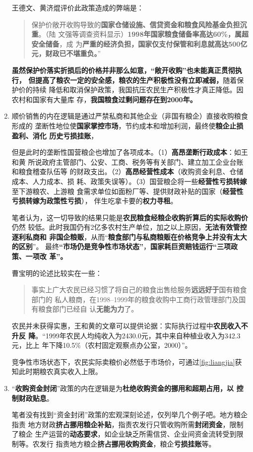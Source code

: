 \begin{enumerate}
  王德文、黄济焜评价此政策造成的弊端是：
  \begin{quotation}
    保护价敞开收购导致的\textbf{国家仓储设施、信贷资金和粮食风险基金负担沉重}。（陆
    文强等调查资料显示）\textbf{1998年国家粮食储备率高达60\%，属超安全储备}，成
    为\textbf{严重的经济负担，国家仅支付保管和利息就高达500亿元，财政已不堪重负。}”
  \end{quotation}

  \textbf{虽然保护价落实折损后的价格并非那么如意，“敞开收购”也未能真正贯彻执行，
    但提高了粮农一定的安全感，粮农的生产积极性没有立即减弱，}随着保护价的持续
  降低和取消保护政策，我国抗压农民生产积极性才真正降低。因农村和国家有大量库
  存，\textbf{我国粮食过剩问题存在到2000年。}

\item 顺价销售的内在逻辑是通过严禁私商和其他企业（非国有粮企）直接收购粮食形成的
  垄断性地位使\textbf{国家掌控市场}，节约成本和增加利润，最终使\textbf{粮企止损盈利、消化
    历史亏损挂账}，

  但是此时的垄断性国营粮企也增加了各项成本。（1）\textbf{高昂垄断行政成本}：如王和黄
  所说政府主管部门、公安、工商、税务等有关部门、建立加工企业台账和粮食稽查队伍等
  的财政支出。（2）\textbf{高昂经营性成本}（收购资金利息、仓储成本、人力成本、损
  耗、政策失误等）。（3）国营粮企将一些\textbf{经营性亏损转嫁}至下游粮农、上游粮
  食需求单位如面粉厂等、提供财政补贴的国家（\textbf{经营性亏损转嫁为政策性亏损}），
  伴生吃拿卡要的\textbf{权力寻租}。

  笔者认为，这一切导致的结果只能是\textbf{农民粮食经粮企收购折算后的实际收购价}仍然
  较低。此时我国仍有2亿多农村生产单位，加之以上原因，\textbf{无法有效管控逐利私商和
    非国企粮贩}，从而“\textbf{粮食部门与私商粮贩在价格竞争上并没有太大的区别}”。
  最终\textbf{“市场仍是竞争性市场状态”}，\textbf{国家耗巨资赔钱运行“三项政策、一项改
    革”。}

  曹宝明的论述比较实在一些：
  \begin{quotation}
    事实上广大农民已经习惯了将自己的粮食出售给服务\textbf{远远好于}国有粮食部门的
    私人粮商，在1998--1999年的粮食收购中工商行政管理部门及国有粮食部门已经自
    认\textbf{无能为力}了。\cite{caobaoming01}
  \end{quotation}

  农民并未获得实惠，王和黄的文章可以提供论据：实际执行过程中\textbf{农民收入不升反
    降}。“1999年农民人均纯收入为2430.0元，其中来自种植业收入为342.3元，比上
  年下降10.5\%（农村固定观察点办公室，2000）”。

  竞争性市场状态下，农民实际卖粮价必然低于市场价，可通过\cref{fig:liangjia}获
  知此时期粮农真实收入上限。

\item “\textbf{收购资金封闭}”政策的内在逻辑是为\textbf{杜绝收购资金的挪用和超期占用，以
    控制财政贴息}。

  笔者没有找到“资金封闭”政策的宏观深刻论述，仅列举几个例子吧。地方粮企指责
  地方财政\textbf{挤占挪用粮企补贴}，指责农发行只管收购所需\textbf{封闭资金}，限制了粮企
  生产运营的\textbf{动态要求}，如企业缺乏所需信贷、企业间资金流转受到限制等。农发行
  指责地方粮企\textbf{挤占挪用收购资金}，粮企\textbf{亏损挂账}等。
\end{enumerate}

